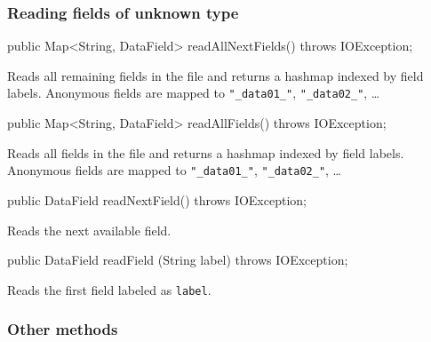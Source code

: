 \subsubsection*{Reading fields of unknown type}
\begin{code}

   public Map<String, DataField> readAllNextFields() throws IOException;
\end{code}
\begin{tabb}
Reads all remaining fields in the file and returns a hashmap indexed
by field labels. Anonymous fields are mapped to \verb|"_data01_"|, \verb|"_data02_"|, \ldots
\end{tabb}
\begin{code}
   
   public Map<String, DataField> readAllFields() throws IOException;
\end{code}
\begin{tabb}
Reads all fields in the file and returns a hashmap indexed
by field labels. Anonymous fields are mapped to \verb|"_data01_"|, \verb|"_data02_"|, \ldots
\end{tabb}
\begin{code}
   
   public DataField readNextField() throws IOException;
\end{code}
\begin{tabb}
Reads the next available field.
\end{tabb}
\begin{htmlonly}
\end{htmlonly}
\begin{code}

   public DataField readField (String label) throws IOException;
\end{code}
\begin{tabb}
Reads the first field labeled as \texttt{label}.
\end{tabb}
\begin{htmlonly}
\end{htmlonly}


\subsubsection*{Other methods}

